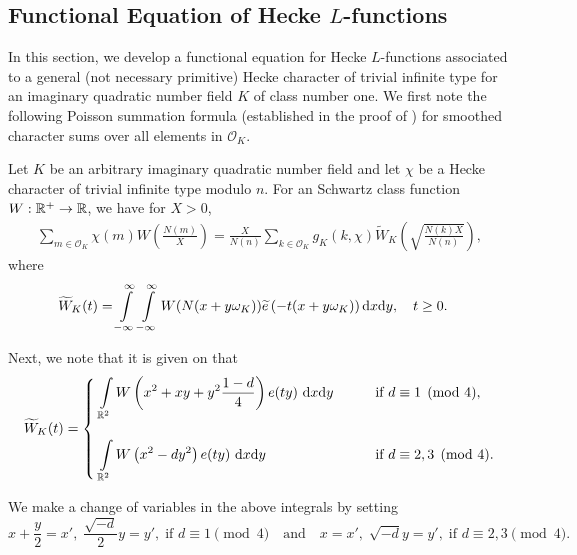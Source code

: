 \documentclass[twoside,leqno,10pt, A4]{amsart}
\begin{document}
\subsection{Functional Equation of Hecke $L$-functions}
    In this section, we develop a functional equation for Hecke $L$-functions associated to a general (not necessary primitive) Hecke character of trivial infinite type for an imaginary quadratic number field $K$ of class number one. We first note the following Poisson summation formula (established in the proof of
\cite[Lemma 2.5]{G&Zhao2022-4}) for smoothed character sums over all elements in $\mathcal{O}_K$.
\begin{lemma}
\label{Poissonsum} Let $K$ be an arbitrary imaginary quadratic number field and let $\chi$ be a Hecke character of trivial infinite type modulo $n$. For an Schwartz class function $W:\mathbb R^{+} \rightarrow \mathbb R$,  we have for $X>0$,
\begin{align}
\label{PoissonsumQw}
   \sum_{m \in \mathcal{O}_K}\chi(m)W\left(\frac {N(m)}{X}\right)=\frac {X}{N(n)}\sum_{k \in
   \mathcal{O}_K}g_K(k,\chi)\widetilde{W}_K\left(\sqrt{\frac {N(k)X}{N(n)}}\right),
\end{align}
   where
\begin{align*}
   \widetilde{W}_K(t) &=\int\limits^{\infty}_{-\infty}\int\limits^{\infty}_{-\infty}W(N(x+y\omega_K))\widetilde{e}\left(-
t(x+y\omega_K)\right)\mathrm{d} x \mathrm{d} y, \quad t
   \geq 0.
\end{align*}
\end{lemma}

   Next, we note that it is given on \cite[p. 184]{G&Zhao2022-4} that
\begin{align*}
     \widetilde{W}_{K}(t)  =
\begin{cases}
\ \displaystyle{   \int\limits_{\mr^2}W \left( x^2+xy+y^2\frac {1-d}{4} \right)e(ty) \ \dif x \dif y}  \qquad & \text{if $d \equiv 1 \pmod
4$}, \\ \\
\ \displaystyle{    \int\limits_{\mr^2}W \left( x^2-dy^2 \right) e(ty) \ \dif x \dif y} \qquad & \text{if $d \equiv 2, 3 \pmod 4$}.
\end{cases}
\end{align*}

   We make a change of variables in the above integrals by setting
\[  x+\frac {y}{2}  =x', \; \frac {\sqrt{-d}}{2}y=y',  \; \text{if $d \equiv 1 \pmod 4$} \quad \text{and} \quad x=x', \; \sqrt{-d}y=y', \; 
\text{if $d \equiv 2, 3 \pmod 4$}. \]
\end{document}
